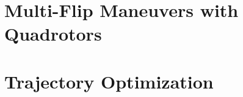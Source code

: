 \documentclass{thesisbeamer}
\begin{document}
\section{Multi-Flip Maneuvers with Quadrotors}

\section{Trajectory Optimization}
\end{document}

